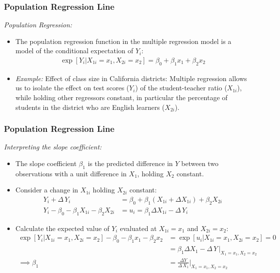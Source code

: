 

\begin{frame}
\frametitle{Population Regression Line}
\emph{Population Regression:}
\begin{itemize}
\item The population regression function in the multiple regression model is a model of the conditional expectation of $Y_{i}$:
\begin{align*}
\exp[Y_{i}|X_{1i}=x_{1}, X_{2i}=x_{2}] 
    = \beta_{0} + \beta_{1} x_{1} + \beta_{2} x_{2}
\end{align*}
\item \emph{Example:} Effect of class size in California districts: 
Multiple regression allows us to isolate the effect on test scores ($Y_{i}$) of the student-teacher ratio ($X_{1i}$), while holding other regressors constant, in particular the percentage of students in the district who are English learners ($X_{2i}$). 
\end{itemize}
\end{frame}


\begin{frame}
\frametitle{Population Regression Line}
\emph{Interpreting the slope coefficient:}
\begin{itemize}
\item The slope coefficient $\beta_{1}$ is the predicted difference in $Y$ between two observations with a unit difference in $X_{1}$, holding $X_{2}$ constant.
\item Consider a change in $X_{1i}$ holding $X_{2i}$ constant:
\begin{align*}
Y_{i} + \Delta\,Y_{i}
    & = \beta_{0} + \beta_{1} (X_{1i} + \Delta X_{1i}) + \beta_{2} X_{2i}\\
Y_{i} - \beta_{0} - \beta_{1} X_{1i} - \beta_{2} X_{2i}
    & = u_{i} = \beta_{1} \Delta X_{1i} - \Delta\,Y_{i}
\end{align*}
\item Calculate the expected value of $Y_{i}$ evaluated at $X_{1i}=x_{1}$ and $X_{2i}=x_{2}$:
\begin{align*}
\exp[Y_{i}|X_{1i} = x_{1}, X_{2i} = x_{2}] - \beta_{0} - \beta_{1} x_{1} - \beta_{2} x_{2} 
                & = \exp[u_{i}|X_{1i} = x_{1}, X_{2i} = x_{2}] = 0\\
    & = \beta_{1} \Delta X_{1} - \Delta\,Y \,\bigg|_{X_{1} = x_{1}, X_{2} = x_{2}}\\
\implies 
\beta_{1}
    & = \frac{\Delta Y}{\Delta\,X_{1}}\bigg|_{X_{1} = x_{1}, X_{2} = x_{2}}
\end{align*}
\end{itemize}
\end{frame}

